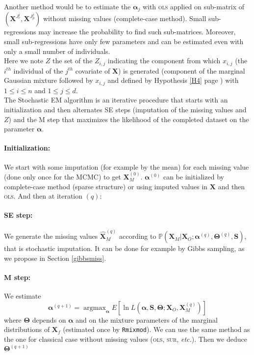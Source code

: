 \documentclass[12pt,a4paper]{report}
\begin{document}
	Another method would be to estimate the $\boldsymbol{\alpha}_j$ with \textsc{ols} applied on sub-matrix of $(\boldsymbol{X}^{J_r^j},\boldsymbol{X}^{J_p^j})$ without missing values (complete-case method). Small sub-regressions may increase the probability to find such sub-matrices. Moreover, small sub-regressions have only few parameters and can be estimated even with only a small number of individuals.\\
	
		Here we note $Z$ the set of the $Z_{i,j}$ indicating the component from which $x_{i,j}$ (the $i^{th}$ individual of the $j^{th}$ covariate of $\boldsymbol{X}$) is generated (component of the marginal Gaussian mixture followed by $x_{i,j}$ and defined by Hypothesis \ref{H4} page \pageref{H4}) with $1\leq i\leq n$ and $1\leq j\leq d$. \\
		
	The Stochastic EM algorithm is an iterative procedure that starts with an initialization and then alternates SE steps (imputation of the missing values and $Z$) and the M step that maximizes the likelihood of the completed dataset on the parameter $\boldsymbol{\alpha}$.
	
	\paragraph{Initialization:} We start with some imputation (for example by the mean) for each missing value (done only once for the MCMC) to get $\boldsymbol{X}_M^{(0)}$. $\boldsymbol{\alpha}^{(0)}$ can be initialized by complete-case method	(sparse structure) or using imputed values in $\boldsymbol{X}$ and then \textsc{ols}.
	And then at iteration $(q)$:
	\paragraph{SE step:}
		We generate the missing values $\hat{\boldsymbol{X}}_M^{(q)}$ according to $\mathbb{P}(\boldsymbol{X}_M|\boldsymbol{X}_O; \boldsymbol{\alpha}^{(q)},\boldsymbol{\Theta}^{(q)},\boldsymbol{S})$, that is stochastic imputation. It can be done for example by Gibbs sampling, as we propose in Section \ref{gibbsmiss}.
	\paragraph{M step:}
		We estimate 
		\begin{equation}
	\boldsymbol{\alpha}^{(q+1)}=\operatorname{argmax}_{\boldsymbol{\alpha}}E\left[\ln L(\boldsymbol{\alpha},\boldsymbol{S},\boldsymbol{\Theta};\boldsymbol{X}_O,\boldsymbol{X}_M^{(q)}) \right]  \nonumber 
\end{equation}
where $\boldsymbol{\Theta}$ depends on $\boldsymbol{\alpha}$ and on the mixture parameters of the marginal distributions of $\boldsymbol{X}_f$ (estimated once by {\tt Rmixmod}). We can use the same method as the one for classical case without missing values (\textsc{ols}, \textsc{sur}, {\it etc.}). Then we deduce $\boldsymbol{\Theta}^{(q+1)}$ \\
\end{document}
